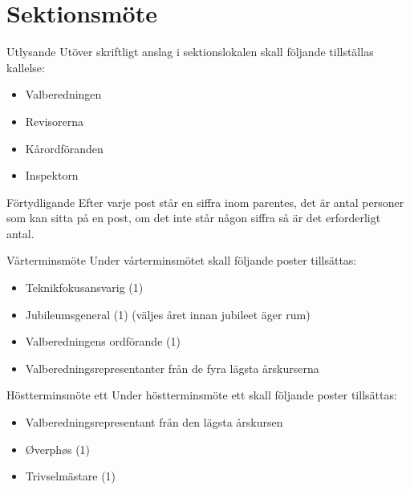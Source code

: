 \documentclass[pdfbookmarks,a4paper,11pt]{article}
\newlength{\itemcollength}
\newenvironment{reglemlista}{%
  \begin{list}{}{%
      \setlength{\labelwidth}{\itemcollength}%
      \setlength{\leftmargin}{\labelwidth + \labelsep}%
      \renewcommand{\makelabel}[1]{%
        \raisebox{0pt}[1ex][0pt]{%
          \makebox[\labelwidth][l]{%
            \parbox[t]{\itemcollength}{%
              \raggedright\hspace{0pt}##1}}}\hfill}%
      }}{%
  \end{list}}
\begin{document}
\section{Sektionsmöte}

\begin{reglemlista}

	\item[Utlysande]
	Utöver skriftligt anslag i sektionslokalen skall följande tillställas kallelse:
	\begin{itemize}
		\item Valberedningen
		\item Revisorerna
		\item Kårordföranden
		\item Inspektorn
	\end{itemize}
	
	\item[Förtydligande]
	Efter varje post står en siffra inom parentes, det är antal personer som kan sitta på en post, om det inte står någon siffra så är det erforderligt antal.

	\item[Vårterminsmöte]
	Under vårterminsmötet skall följande poster tillsättas:
	\begin{itemize}

		\item Teknikfokusansvarig (1)
		\item Jubileumsgeneral (1) (väljes året innan jubileet äger rum)
		\item Valberedningens ordförande (1)
		\item Valberedningsrepresentanter från de fyra lägsta årskurserna
	\end{itemize}

	\item[Höstterminsmöte ett]
	Under höstterminsmöte ett skall följande poster tillsättas:
	\begin{itemize}
		\item Valberedningsrepresentant från den lägsta årskursen
		\item Øverphøs (1)
		\item Trivselmästare (1)
	\end{itemize}


\end{reglemlista}
\end{document}
